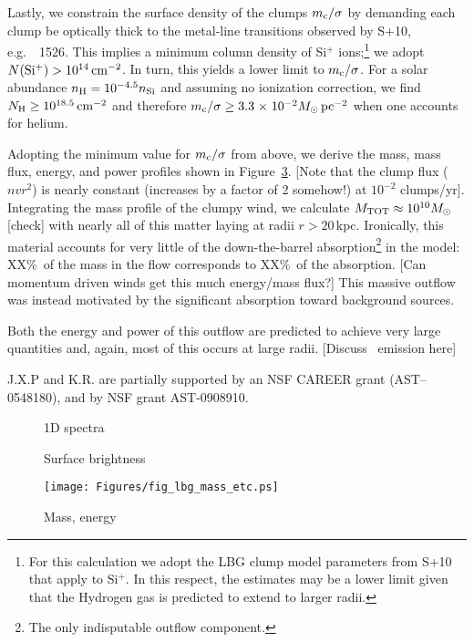 \documentclass[12pt,preprint]{aastex}
\begin{document}
Lastly, we constrain the surface density of the clumps $m_{\rm
  c}/\sigma$ by demanding each clump be optically thick to the
metal-line transitions observed by S+10, e.g.\ ~1526.  
This implies a minimum column density of Si$^+$ ions;\footnote{For this
  calculation we adopt the LBG clump model parameters from S+10 that
  apply to Si$^+$.  In this respect, the estimates may be a lower
  limit given that the Hydrogen gas is predicted to extend to larger
  radii.} 
we adopt
${N({\rm Si^+})} > 10^{14} \, {\rm cm^{-2}}$.  In turn, this yields a lower limit to
$m_{\rm c}/\sigma$.  For a solar abundance $n_{\rm H} = 10^{-4.5}
n_{\rm Si}$ and assuming no ionization correction, we find $N_{\rm H}
\ge 10^{18.5} \, {\rm cm^{-2}}$ and therefore $m_{\rm c} / \sigma \ge 3.3
{\; \times \; 10^{-2}} M_\odot \, \rm pc^{-2}$ when one accounts for helium.

Adopting the minimum value for $m_{\rm c}/\sigma$ from above,  we derive the mass,
mass flux, energy, and power profiles shown in
Figure~\ref{fig:mass_energy}.
[Note that the clump flux ($nvr^2$) is nearly constant (increases by a
factor of 2 somehow!) at $10^{-2}$ clumps/yr].
Integrating the mass profile of the clumpy wind, we calculate 
$M_{\rm TOT} \approx 10^{10} M_\odot$ [check] with nearly all of this
matter laying at radii $r>20$\,kpc.  Ironically, this material accounts for very little
of the down-the-barrel absorption\footnote{The only indisputable
  outflow component.} in the model: XX\%\ of the mass in the flow
corresponds to XX\%\ of the absorption.  
[Can momentum driven winds get this much energy/mass flux?]
This massive outflow was instead motivated by the significant
absorption toward background sources.

Both the energy and power of this outflow are predicted to achieve
very large quantities and, again, most of this occurs at large radii.
[Discuss \lya\ emission here]

\acknowledgments

J.X.P and K.R. are partially supported
by an NSF CAREER grant (AST--0548180), and 
by NSF grant AST-0908910.

\clearpage

%
%



\clearpage

%

\begin{figure}
\caption{
1D spectra
}
\label{fig:1D}
\end{figure}

\begin{figure}
\caption{
Surface brightness
}
\label{fig:SB}
\end{figure}

\begin{figure}
\texttt{[image: Figures/fig\_lbg\_mass\_etc.ps]}
\caption{
Mass, energy
}
\label{fig:mass_energy}
\end{figure}
\end{document}
